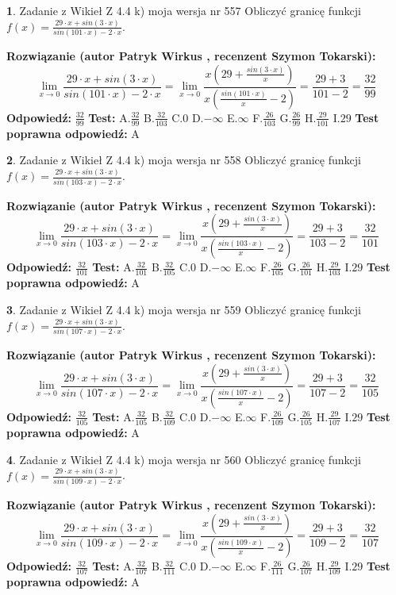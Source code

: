 \documentclass[12pt, a4paper]{article}
\theoremstyle{definition} %
\newtheorem{zad}{}
\newcommand{\zadStart}[1]{\begin{zad}#1\newline}
\newcommand{\zadStop}{\end{zad}}
\newcommand{\rozwStart}[2]{\noindent \textbf{Rozwiązanie (autor #1 , recenzent #2): }\newline}
\newcommand{\rozwStop}{\newline}
\newcommand{\odpStart}{\noindent \textbf{Odpowiedź:}\newline}
\newcommand{\odpStop}{\newline}
\newcommand{\testStart}{\noindent \textbf{Test:}\newline}
\newcommand{\testStop}{\newline}
\newcommand{\kluczStart}{\noindent \textbf{Test poprawna odpowiedź:}\newline}
\newcommand{\kluczStop}{\newline}
\begin{document}
\zadStart{Zadanie z Wikieł Z 4.4 k) moja wersja nr 557}
Obliczyć granicę funkcji $f(x)=\frac{29\cdot x +sin(3\cdot x)}{sin(101\cdot x) -2\cdot x}$.
\zadStop
\rozwStart{Patryk Wirkus}{Szymon Tokarski}
$$\lim\limits_{x\to 0}\frac{29\cdot x +sin(3\cdot x)}{sin(101\cdot x) -2\cdot x}
=\lim\limits_{x\to 0}\frac{x(29+\frac{sin(3\cdot x)}{x})}{x(\frac{sin(101\cdot x)}{x}-2)}
=\frac{29+3}{101-2} = \frac{32}{99}$$
\rozwStop
\odpStart
$\frac{32}{99}$
\odpStop
\testStart
A.$\frac{32}{99}$
B.$\frac{32}{103}$
C.$0$
D.$-\infty$
E.$\infty$
F.$\frac{26}{103}$
G.$\frac{26}{99}$
H.$\frac{29}{101}$
I.$29$
\testStop
\kluczStart
A
\kluczStop



\zadStart{Zadanie z Wikieł Z 4.4 k) moja wersja nr 558}
Obliczyć granicę funkcji $f(x)=\frac{29\cdot x +sin(3\cdot x)}{sin(103\cdot x) -2\cdot x}$.
\zadStop
\rozwStart{Patryk Wirkus}{Szymon Tokarski}
$$\lim\limits_{x\to 0}\frac{29\cdot x +sin(3\cdot x)}{sin(103\cdot x) -2\cdot x}
=\lim\limits_{x\to 0}\frac{x(29+\frac{sin(3\cdot x)}{x})}{x(\frac{sin(103\cdot x)}{x}-2)}
=\frac{29+3}{103-2} = \frac{32}{101}$$
\rozwStop
\odpStart
$\frac{32}{101}$
\odpStop
\testStart
A.$\frac{32}{101}$
B.$\frac{32}{105}$
C.$0$
D.$-\infty$
E.$\infty$
F.$\frac{26}{105}$
G.$\frac{26}{101}$
H.$\frac{29}{103}$
I.$29$
\testStop
\kluczStart
A
\kluczStop



\zadStart{Zadanie z Wikieł Z 4.4 k) moja wersja nr 559}
Obliczyć granicę funkcji $f(x)=\frac{29\cdot x +sin(3\cdot x)}{sin(107\cdot x) -2\cdot x}$.
\zadStop
\rozwStart{Patryk Wirkus}{Szymon Tokarski}
$$\lim\limits_{x\to 0}\frac{29\cdot x +sin(3\cdot x)}{sin(107\cdot x) -2\cdot x}
=\lim\limits_{x\to 0}\frac{x(29+\frac{sin(3\cdot x)}{x})}{x(\frac{sin(107\cdot x)}{x}-2)}
=\frac{29+3}{107-2} = \frac{32}{105}$$
\rozwStop
\odpStart
$\frac{32}{105}$
\odpStop
\testStart
A.$\frac{32}{105}$
B.$\frac{32}{109}$
C.$0$
D.$-\infty$
E.$\infty$
F.$\frac{26}{109}$
G.$\frac{26}{105}$
H.$\frac{29}{107}$
I.$29$
\testStop
\kluczStart
A
\kluczStop



\zadStart{Zadanie z Wikieł Z 4.4 k) moja wersja nr 560}
Obliczyć granicę funkcji $f(x)=\frac{29\cdot x +sin(3\cdot x)}{sin(109\cdot x) -2\cdot x}$.
\zadStop
\rozwStart{Patryk Wirkus}{Szymon Tokarski}
$$\lim\limits_{x\to 0}\frac{29\cdot x +sin(3\cdot x)}{sin(109\cdot x) -2\cdot x}
=\lim\limits_{x\to 0}\frac{x(29+\frac{sin(3\cdot x)}{x})}{x(\frac{sin(109\cdot x)}{x}-2)}
=\frac{29+3}{109-2} = \frac{32}{107}$$
\rozwStop
\odpStart
$\frac{32}{107}$
\odpStop
\testStart
A.$\frac{32}{107}$
B.$\frac{32}{111}$
C.$0$
D.$-\infty$
E.$\infty$
F.$\frac{26}{111}$
G.$\frac{26}{107}$
H.$\frac{29}{109}$
I.$29$
\testStop
\kluczStart
A
\kluczStop
\end{document}
